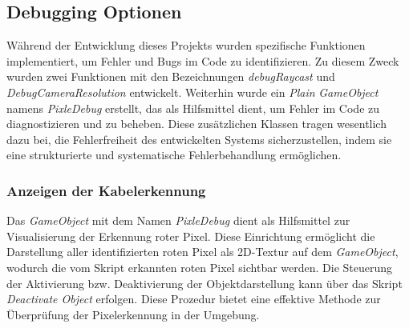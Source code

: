 \subsection{Debugging Optionen}
Während der Entwicklung dieses Projekts wurden spezifische Funktionen implementiert, um Fehler und Bugs im Code zu identifizieren. Zu diesem Zweck wurden zwei Funktionen mit den Bezeichnungen \textit{debugRaycast} und \textit{DebugCameraResolution} entwickelt. Weiterhin wurde ein \textit{Plain} \textit{GameObject} namens \textit{PixleDebug} erstellt, das als Hilfsmittel dient, um Fehler im Code zu diagnostizieren und zu beheben. Diese zusätzlichen Klassen tragen wesentlich dazu bei, die Fehlerfreiheit des entwickelten Systems sicherzustellen, indem sie eine strukturierte und systematische Fehlerbehandlung ermöglichen.

\subsubsection{\label{sec:PlaneDebug}Anzeigen der Kabelerkennung}
Das \textit{GameObject} mit dem Namen \textit{PixleDebug} dient als Hilfsmittel zur Visualisierung der Erkennung roter Pixel. Diese Einrichtung ermöglicht die Darstellung aller identifizierten roten Pixel als 2D-Textur auf dem \textit{GameObject}, wodurch die vom Skript erkannten roten Pixel sichtbar werden. Die Steuerung der Aktivierung bzw. Deaktivierung der Objektdarstellung kann über das Skript \textit{Deactivate Object} erfolgen. Diese Prozedur bietet eine effektive Methode zur Überprüfung der Pixelerkennung in der Umgebung.

